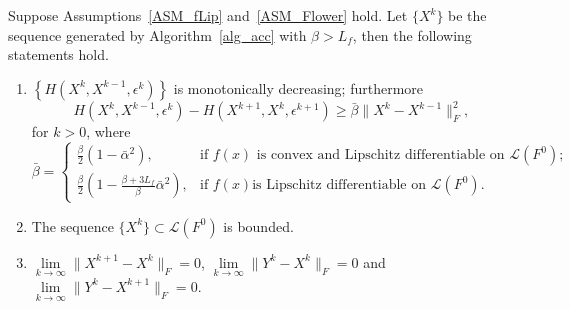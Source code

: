 \documentclass[twoside,11pt]{article}
\numberwithin{equation}{section}
\begin{document}
\begin{lemma} \label{lem_Dec_acc}
  Suppose Assumptions~\ref{ASM_fLip} and~\ref{ASM_Flower} hold. Let $\{X^{k}\} $ be the sequence generated by Algorithm~\ref{alg_acc} with $\beta>L_{f} $, then the following statements hold.
  \begin{enumerate}[label={(\roman*).}, leftmargin=*]
  \item $\left\{H (X^{k},X^{k-1},\epsilon^{k})\right\} $ is monotonically decreasing;  furthermore
    \begin{equation*}
      H (X^{k},X^{k-1},\epsilon^{k}) - H (X^{k+1},X^{k},\epsilon^{k+1})\ge
      \bar{\beta}\|X^{k}-X^{k-1}\|_{F}^{2},
    \end{equation*}
    for $k> 0$, where 
    \begin{equation*}
        \bar{\beta}=\begin{cases}
        \frac{\beta}{2} (1-\bar{\alpha}^{2}), & \text{if } f (x) \text{ is convex and Lipschitz differentiable on } \mathcal{L}(F^{0})   ; \\
        \frac{\beta}{2} (1-\frac{\beta+3L_{f}}{\beta}\bar{\alpha}^{2}), & \text{if } f (x) \text{is Lipschitz differentiable on } \mathcal{L}(F^{0}). 
    \end{cases}
\end{equation*}
  \item The sequence $\{X^{k}\}\subset\mathcal{L} (F^{0}) $ is bounded.
  \item $\lim\limits_{k\to\infty} \|X^{k+1}-X^{k}\|_{F}=0 $,  $\lim\limits_{k\to\infty} \|Y^{k}-X^{k}\|_{F}=0 $ and $\lim\limits_{k\to\infty} \|Y^{k}-X^{k+1}\|_{F}=0 $.
  \end{enumerate}
\end{lemma}
\end{document}
